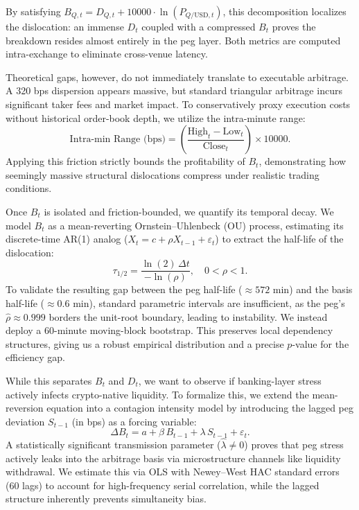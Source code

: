 \documentclass[12pt,twocolumn]{article}
\begin{document}
By satisfying $B_{Q,t}=D_{Q,t}+10000\cdot\ln(P_{Q/\text{USD},t})$, this decomposition localizes the dislocation: an immense $D_t$ coupled with a compressed $B_t$ proves the breakdown resides almost entirely in the peg layer. Both metrics are computed intra-exchange to eliminate cross-venue latency. 

Theoretical gaps, however, do not immediately translate to executable arbitrage. A 320 bps dispersion appears massive, but standard triangular arbitrage incurs significant taker fees and market impact. To conservatively proxy execution costs without historical order-book depth, we utilize the intra-minute range:
\begin{equation}
    \text{Intra-min Range (bps)} = \left( \frac{\text{High}_t - \text{Low}_t}{\text{Close}_t} \right)\times 10000.
\end{equation}
Applying this friction strictly bounds the profitability of $B_t$, demonstrating how seemingly massive structural dislocations compress under realistic trading conditions.

Once $B_t$ is isolated and friction-bounded, we quantify its temporal decay. We model $B_t$ as a mean-reverting Ornstein--Uhlenbeck (OU) process, estimating its discrete-time AR(1) analog ($X_t = c + \rho X_{t-1} + \varepsilon_t$) to extract the half-life of the dislocation:
\begin{equation}
    \tau_{1/2} = \frac{\ln(2)\,\Delta t}{-\ln(\rho)}, \quad 0<\rho<1.
\end{equation}
To validate the resulting gap between the peg half-life (${\approx}572$ min) and the basis half-life (${\approx}0.6$ min), standard parametric intervals are insufficient, as the peg's $\hat\rho \approx 0.999$ borders the unit-root boundary, leading to instability. We instead deploy a 60-minute moving-block bootstrap. This preserves local dependency structures, giving us a robust empirical distribution and a precise $p$-value for the efficiency gap.

While this separates $B_t$ and $D_t$, we want to observe if banking-layer stress actively infects crypto-native liquidity. To formalize this, we extend the mean-reversion equation into a contagion intensity model by introducing the lagged peg deviation $S_{t-1}$ (in bps) as a forcing variable:
\begin{equation}\label{eq:contagion}
    \Delta B_t = a + \beta\, B_{t-1} + \lambda\, S_{t-1} + \varepsilon_t.
\end{equation}
A statistically significant transmission parameter ($\hat\lambda \neq 0$) proves that peg stress actively leaks into the arbitrage basis via microstructure channels like liquidity withdrawal. We estimate this via OLS with Newey--West HAC standard errors (60 lags) to account for high-frequency serial correlation, while the lagged structure inherently prevents simultaneity bias.
\end{document}
